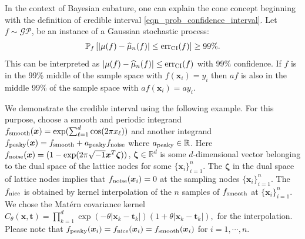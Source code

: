 \documentclass{svjour3}                     %
\newcommand{\bm}[1]{\boldsymbol{#1}}
\newcommand{\reals}{\mathbb{R}}
\newcommand{\vzeta}{{\bm{\zeta}}}
\newcommand{\vt}{\bm{t}}
\newcommand{\vx}{\bm{x}}
\newcommand{\hmu}{\widehat{\mu}}
\newcommand{\CI}{\textup{CI}}
\newcommand{\NICE}{\textup{nice}}
\newcommand{\PEAKY}{\textup{peaky}}
\newcommand{\NOISE}{\textup{noise}}
\newcommand{\TRUE}{\textup{smooth}}
\newcommand{\err}{\textup{err}}
\begin{document}
In the context of Bayesian cubature, one can explain the cone concept beginning with the definition of credible interval \eqref{eqn_prob_confidence_interval}. 
Let $f \sim \mathcal{GP}$, be an instance of a Gaussian stochastic process:
\begin{align*}
\mathbb{P}_f \left[
|\mu(f)-\hmu_n(f)| \leq \err_{\CI}(f) \right] \ge 99\%.
\end{align*}
This can be interpreted as $|\mu(f)-\hmu_n(f)| \leq \err_{\CI}(f)$ with 99\% confidence. If $f$ is in the 99\% middle of the sample space with $f(\vx_i) = y_i$ then $af$ is also in the middle 99\% of the sample space with $a f(\vx_i) = a y_i$.

We demonstrate the credible interval using the following example. For this purpose, choose a smooth and periodic integrand $f_{\TRUE}(\vx) = \exp(\sum_{\ell=1}^{d} \cos(2\pi x_\ell))$ and another integrand $f_{\PEAKY}(\vx) = f_{\TRUE} + a_{\PEAKY} f_{\NOISE}$ where $a_{\PEAKY} \in \reals$. 
Here $f_{\NOISE}(\vx) = (1 - \exp(2\pi \sqrt{-1} \vx^T \vzeta))$, $\vzeta \in \reals^d$ is some $d$-dimensional vector belonging to the dual space of the lattice nodes for some $\{ \vx_i\}_{i=1}^n$. %
The $\vzeta$ in the dual space of lattice nodes implies that $f_{\NOISE}(\vx_i)=0$ at the sampling nodes $\{ \vx_i\}_{i=1}^n$.
The $f_{\NICE}$ is obtained by kernel interpolation of the $n$ samples of $f_\TRUE$ at $\{ \vx_i\}_{i=1}^n$. We chose the Mat\'ern covariance kernel
$
	C_{\theta}(\vx, \vt) = \prod_{k=1}^d \exp(-\theta|\vx_k-\vt_k|)(1+\theta |\vx_k-\vt_k|),
$ for the interpolation.
Please note that $f_{\PEAKY}(\vx_i) = f_{\NICE}(\vx_i) = f_{\TRUE}(\vx_i) $ for $i=1, \cdots, n$.
\end{document}
